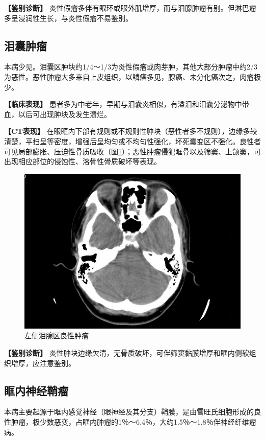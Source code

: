 \textbf{【鉴别诊断】}
炎性假瘤多伴有眼环或眼外肌增厚，而与泪腺肿瘤有别。但淋巴瘤多呈浸润性生长，与炎性假瘤不易鉴别。

\subsection{泪囊肿瘤}

本病少见。泪囊区肿块约1/4～1/3为炎性假瘤或肉芽肿，其他大部分肿瘤中约2/3为恶性。恶性肿瘤大多来自上皮组织，以鳞癌多见，腺癌、未分化癌次之，肉瘤极少。

\textbf{【临床表现】}
患者多为中老年，早期与泪囊炎相似，有溢泪和泪囊分泌物中带血，以后可出现肿块及发生溃烂。

\textbf{【CT表现】}
在眼眶内下部有规则或不规则性肿块（恶性者多不规则），边缘多较清楚，平扫呈等密度，增强后呈均匀或不均匀性强化，坏死囊变区不强化。良性者可见局部膨胀、压迫性骨质吸收（图\ref{fig3-6}）；恶性肿瘤侵犯眶骨以及筛窦、上颌窦，可出现相应部位的侵蚀性、溶骨性骨质破坏等表现。

\begin{figure}[!htbp]
 \centering
 \includegraphics[width=.7\textwidth,height=\textheight,keepaspectratio]{./images/Image00104.jpg}
 \captionsetup{justification=centering}
 \caption{左侧泪腺区良性肿瘤}
 \label{fig3-6}
  \end{figure} 

\textbf{【鉴别诊断】}
炎性肿块边缘欠清，无骨质破坏，可伴筛窦黏膜增厚和眶内侧软组织增厚，应注意鉴别。

\subsection{眶内神经鞘瘤}

本病主要起源于眶内感觉神经（眼神经及其分支）鞘膜，是由雪旺氏细胞形成的良性肿瘤，极少数恶变，占眶内肿瘤的1％～6.4％，大约1.5％～1.8％伴神经纤维瘤病。

